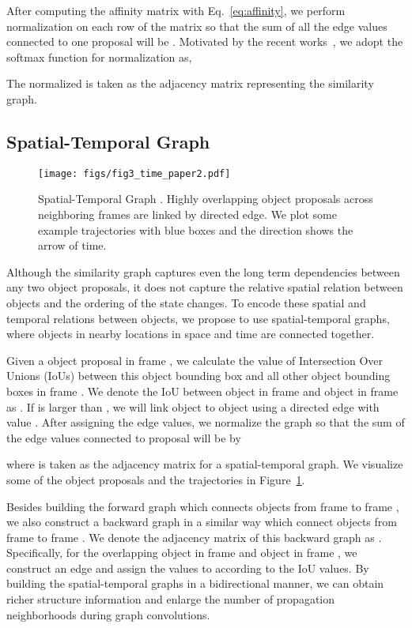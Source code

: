 \documentclass[runningheads]{llncs}
\begin{document}
After computing the affinity matrix with Eq.~\ref{eq:affinity}, we perform normalization on each row of the matrix so that the sum of all the edge values connected to one proposal  will be . Motivated by the recent works~\cite{Vaswani2017,xiaolongwang2017nonlocal}, we adopt the softmax function for normalization as, 


The normalized  is taken as the adjacency matrix representing the similarity graph. 

\vspace{-0.1in}
\subsection{Spatial-Temporal Graph}
\vspace{-0.05in}

\begin{figure}[t]
\centering
\texttt{[image: figs/fig3\_time\_paper2.pdf]}
\vspace{-1em}
\caption{Spatial-Temporal Graph . Highly overlapping object proposals across neighboring frames are linked by directed edge. We plot some example trajectories with blue boxes and the direction shows the arrow of time. }
\label{fig:timegraph}
\vspace{-1em}
\end{figure}


Although the similarity graph captures even the long term dependencies between any two object proposals, it does not capture the relative spatial relation between objects and the ordering of the state changes. To encode these spatial and temporal relations between objects, we propose to use spatial-temporal graphs, where objects in  nearby locations in space and time are connected together. 

Given a object proposal in frame , we calculate the value of Intersection Over Unions (IoUs) between this object bounding box and all other object bounding boxes in frame . We denote the IoU between object  in frame  and object  in frame  as . If  is larger than , we will link object  to object  using a directed edge  with value . After assigning the edge values, we normalize the graph so that the sum of the edge values connected to proposal  will be  by 

where  is taken as the adjacency matrix for a spatial-temporal graph.  We visualize some of the object proposals and the trajectories in Figure~\ref{fig:timegraph}. 

Besides building the forward graph which connects objects from frame  to frame , we also construct a backward graph in a similar way which connect objects from frame  to frame . We denote the adjacency matrix of this backward graph as . Specifically, for the overlapping object  in frame  and object  in frame , we construct an edge  and assign the values to  according to the IoU values. By building the spatial-temporal graphs in a bidirectional manner, we can obtain richer structure information and enlarge the number of propagation neighborhoods during graph convolutions. 
\end{document}

